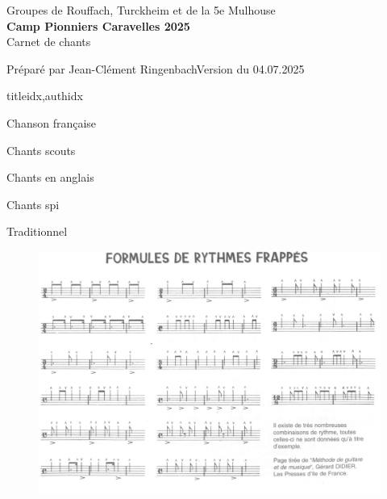\documentclass[9pt]{article}
\newcommand{\mysongsection}[1]{\begin{intersong*}\begin{center}{\sffamily\Huge #1}\end{center}\end{intersong*}}
\begin{document}
\vspace{.2cm}
\begin{center}
    {\Large{Groupes de Rouffach, Turckheim et de la 5e Mulhouse}}\\ \vspace{.5cm}
    {\Huge{\textbf{Camp Pionniers Caravelles 2025}}}\\ \vspace{.5cm}
    {\Large{Carnet de chants}}
\end{center}
%

\newpage
\vspace*{\fill}
\hspace{-.8cm}Préparé par Jean-Clément Ringenbach\hfill Version du 04.07.2025
\newpage




\setlength{}


\begin{songs}{titleidx,authidx}
\mysongsection{Chanson française}

%
\mysongsection{Chants scouts}

%
\mysongsection{Chants en anglais}

%
\mysongsection{Chants spi}

%
\mysongsection{Traditionnel}

%
% 

\end{songs}

\begin{figure}[ht!]
    \centering
    \includegraphics[width=.95\linewidth]{photos_accords/rythmes.png}
\end{figure}
\end{document}
